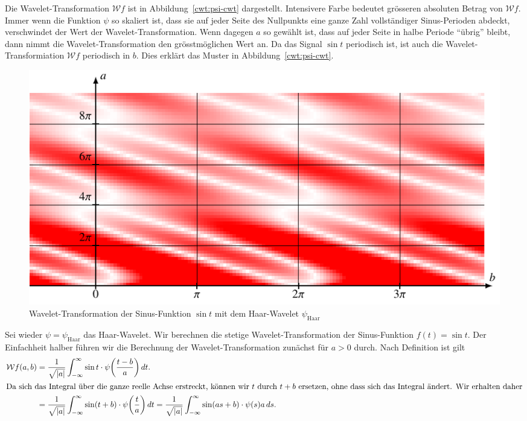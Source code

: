 \begin{beispiel}
Die Wavelet-Transformation $\mathcal{W}f$ ist in Abbildung~\ref{cwt:psi-cwt}
dargestellt.
Intensivere Farbe bedeutet grösseren absoluten Betrag von $\mathcal{W}f$.
Immer wenn die Funktion $\psi$ so skaliert ist, dass sie auf jeder
Seite des Nullpunkts eine ganze Zahl vollständiger Sinus-Perioden abdeckt,
verschwindet der Wert der Wavelet-Transformation.
Wenn dagegen $a$ so gewählt ist, dass auf jeder Seite in halbe Periode
``übrig'' bleibt, dann nimmt die Wavelet-Transformation den grösstmöglichen
Wert an.
Da das Signal $\sin t$ periodisch ist, ist auch die Wavelet-Transformiation
$\mathcal{W}f$ periodisch in $b$.
Dies erklärt das Muster in Abbildung~\ref{cwt:psi-cwt}.
\end{beispiel}

\begin{beispiel}
\begin{figure}
\centering
\includegraphics[width=\hsize]{chapters/4-cwt/images/wsin.pdf}
\caption{Wavelet-Transformation der Sinus-Funktion $\sin t$
mit dem Haar-Wavelet $\psi_{\text{Haar}}$
\label{cwt:wsin}}
\end{figure}
Sei wieder $\psi=\psi_{\text{Haar}}$ das Haar-Wavelet.
Wir berechnen die stetige Wavelet-Transformation der Sinus-Funktion
$f(t)=\sin t$.
Der Einfachheit halber führen wir die Berechnung der Wavelet-Transformation
zunächst für $a>0$ durch.
Nach Definition ist gilt
\begin{align*}
\mathcal{W}f (a,b)
&=
\frac{1}{\sqrt{|a|}}
\int_{-\infty}^\infty \sin t\cdot \psi\biggl(\frac{t-b}{a}\biggr)\,dt.
\\
\intertext{Da sich das Integral über die ganze reelle Achse erstreckt,
können wir $t$ durch $t+b$ ersetzen, ohne dass sich das Integral ändert.
Wir erhalten daher}
&=
\frac{1}{\sqrt{|a|}}
\int_{-\infty}^\infty \sin (t+b)\cdot \psi\biggl(\frac{t}{a}\biggr)\,dt
=
\frac{1}{\sqrt{|a|}}
\int_{-\infty}^\infty \sin (as+b)\cdot \psi(s) a\,ds.
\\

\end{align*}
\end{beispiel}
